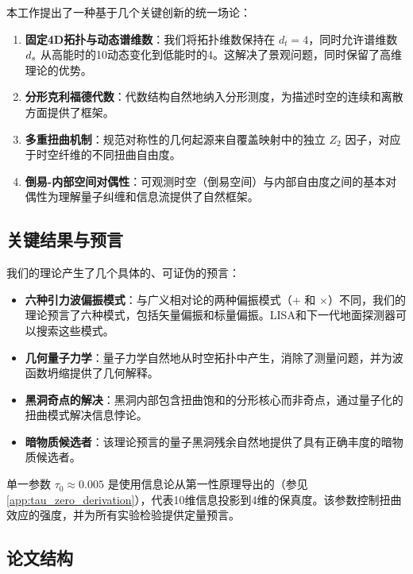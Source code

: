 本工作提出了一种基于几个关键创新的统一场论：

\begin{enumerate}
    \item \textbf{固定4D拓扑与动态谱维数}：我们将拓扑维数保持在 $d_t = 4$，同时允许谱维数 $d_s$ 从高能时的10动态变化到低能时的4。这解决了景观问题，同时保留了高维理论的优势。
    
    \item \textbf{分形克利福德代数}：代数结构自然地纳入分形测度，为描述时空的连续和离散方面提供了框架。
    
    \item \textbf{多重扭曲机制}：规范对称性的几何起源来自覆盖映射中的独立 $Z_2$ 因子，对应于时空纤维的不同扭曲自由度。
    
    \item \textbf{倒易-内部空间对偶性}：可观测时空（倒易空间）与内部自由度之间的基本对偶性为理解量子纠缠和信息流提供了自然框架。
\end{enumerate}

\subsection{关键结果与预言}

我们的理论产生了几个具体的、可证伪的预言：

\begin{itemize}
    \item \textbf{六种引力波偏振模式}：与广义相对论的两种偏振模式（$+$ 和 $\times$）不同，我们的理论预言了六种模式，包括矢量偏振和标量偏振。LISA和下一代地面探测器可以搜索这些模式。
    
    \item \textbf{几何量子力学}：量子力学自然地从时空拓扑中产生，消除了测量问题，并为波函数坍缩提供了几何解释。
    
    \item \textbf{黑洞奇点的解决}：黑洞内部包含扭曲饱和的分形核心而非奇点，通过量子化的扭曲模式解决信息悖论。
    
    \item \textbf{暗物质候选者}：该理论预言的量子黑洞残余自然地提供了具有正确丰度的暗物质候选者。
\end{itemize}

单一参数 $\tau_0 \approx 0.005$ 是使用信息论从第一性原理导出的（参见 \cref{app:tau_zero_derivation}），代表10维信息投影到4维的保真度。该参数控制扭曲效应的强度，并为所有实验检验提供定量预言。

\subsection{论文结构}

